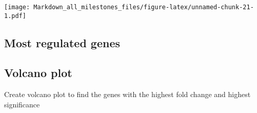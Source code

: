 \documentclass[]{article}
\begin{document}
\texttt{[image: Markdown\_all\_milestones\_files/figure-latex/unnamed-chunk-21-1.pdf]}

\hypertarget{most-regulated-genes-1}{%
\subsection{\texorpdfstring{\textbf{Most regulated
genes}}{Most regulated genes}}\label{most-regulated-genes-1}}

\hypertarget{volcano-plot}{%
\subsection{Volcano plot}\label{volcano-plot}}

Create volcano plot to find the genes with the highest fold change and
highest significance
\end{document}
